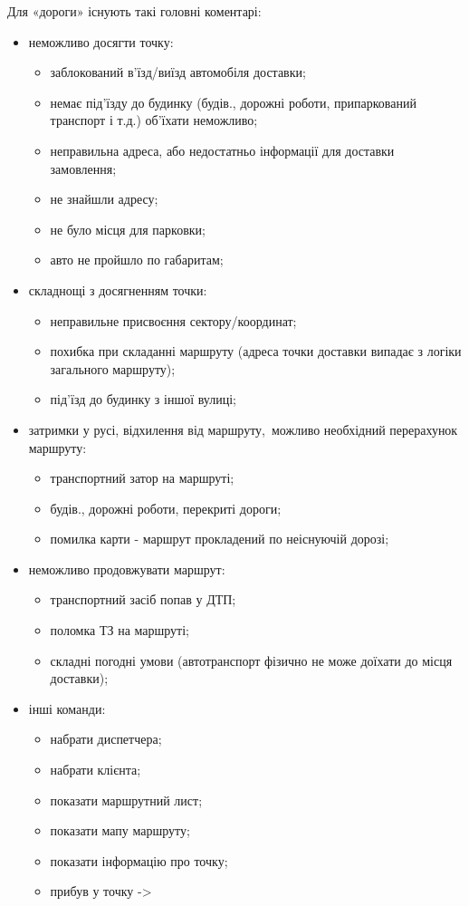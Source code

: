 Для «дороги» існують такі головні коментарі:
\begin{itemize}
	\item неможливо досягти точку:
	\begin{itemize}
		\item заблокований в'їзд/виїзд автомобіля доставки;
		\item немає під'їзду до будинку (будів., дорожні роботи, припаркований транспорт і т.д.) об'їхати неможливо;
		\item неправильна адреса, або недостатньо інформації для доставки замовлення;
		\item не знайшли адресу;
		\item не було місця для парковки;
		\item авто не пройшло по габаритам;
	\end{itemize}
	\item складнощі з досягненням точки:
	\begin{itemize}
		\item неправильне присвоєння сектору/координат;
		\item похибка при складанні маршруту (адреса точки доставки випадає з логіки загального маршруту);
		\item під'їзд до будинку з іншої вулиці;
	\end{itemize}
	\item затримки у русі, відхилення від маршруту, можливо необхідний перерахунок маршруту:
	\begin{itemize}
		\item транспортний затор на маршруті;
		\item будів., дорожні роботи, перекриті дороги;
		\item помилка карти - маршрут прокладений по неіснуючій дорозі;
	\end{itemize}
	\item неможливо продовжувати маршрут:
	\begin{itemize}
		\item транспортний засіб попав у ДТП;
		\item поломка ТЗ на маршруті;
		\item складні погодні умови (автотранспорт фізично не може доїхати до місця доставки);
	\end{itemize}
	\item інші команди:
	\begin{itemize}
		\item набрати диспетчера;
		\item набрати клієнта;
		\item показати маршрутний лист;
		\item показати мапу маршруту;
		\item показати інформацію про точку;
		\item прибув у точку ->
	\end{itemize}
\end{itemize}

